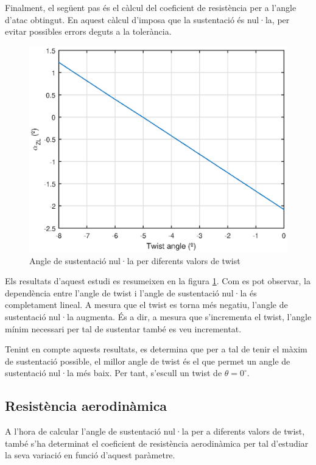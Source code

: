 Finalment, el següent pas és el càlcul del coeficient de resistència per a l'angle d'atac obtingut. En aquest càlcul d'imposa que la sustentació és nul·la, per evitar possibles errors deguts a la tolerància.

\begin{figure}[h]
	\centering
	\includegraphics{./plots/zlangle}
	\caption{Angle de sustentació nul·la per diferents valors de twist}
	\label{zla}
\end{figure}

Els resultats d'aquest estudi es resumeixen en la figura \ref{zla}. Com es pot observar, la dependència entre l'angle de twist i l'angle de sustentació nul·la és completament lineal. A mesura que el twist es torna més negatiu, l'angle de sustentació nul·la augmenta. És a dir, a mesura que s'incrementa el twist, l'angle mínim necessari per tal de sustentar també es veu incrementat.

Tenint en compte aquests resultats, es determina que per a tal de tenir el màxim de sustentació possible, el millor angle de twist és el que permet un angle de sustentació nul·la més baix. Per tant, s'escull un twist de $\theta=0^{\circ}$.

\subsection{Resistència aerodinàmica}
A l'hora de calcular l'angle de sustentació nul·la per a diferents valors de twist, també s'ha determinat el coeficient de resistència aerodinàmica per tal d'estudiar la seva variació en funció d'aquest paràmetre.


